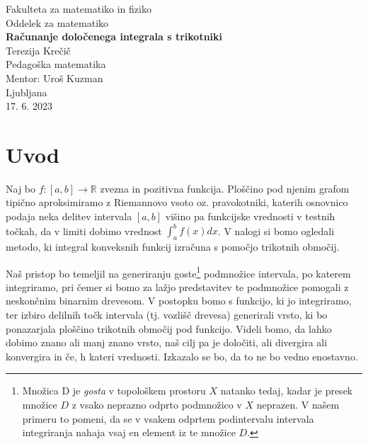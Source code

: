 \documentclass[a4paper, 12pt, titlepage]{article}
\begin{document}
\begin{titlepage}
    \begin{center}
        \large
        Fakulteta za matematiko in fiziko\\
        Oddelek za matematiko \\
        \vspace{8cm}
        \Huge
        \textbf{Računanje določenega integrala s trikotniki} \\
        \vspace{7.5cm}
        \large
        Terezija Krečič\\
        Pedagoška matematika\\
        \vspace{1cm}
        Mentor: Uroš Kuzman\\
        \vspace{0.5cm}
        Ljubljana\\
        17. 6. 2023
    \end{center}
\end{titlepage}

\tableofcontents
\newpage

\section{Uvod}

Naj bo $ f: [a,b] \rightarrow \mathbb{R} $ zvezna in pozitivna funkcija. Ploščino pod njenim grafom tipično aproksimiramo z Riemannovo vsoto oz. pravokotniki, katerih osnovnico podaja neka delitev intervala $[a,b]$ višino pa funkcijske vrednosti v testnih točkah, da v limiti dobimo vrednost $ \int_{a}^{b}f(x)dx $. V nalogi si bomo ogledali metodo, ki integral konveksnih funkcij izračuna s pomočjo trikotnih območij.

Naš pristop bo temeljil na generiranju goste\footnote{Množica D je \emph{gosta} v topološkem prostoru $ X $ natanko tedaj, kadar je presek množice $ D $ z vsako neprazno odprto podmnožico v $ X $ neprazen. V našem primeru to pomeni, da se v vsakem odprtem podintervalu intervala integriranja nahaja vsaj en element iz te množice $ D $.} podmnožice intervala, po katerem integriramo, pri čemer si bomo za lažjo predstavitev te podmnožice pomogali z neskončnim binarnim drevesom. V postopku bomo s funkcijo, ki jo integriramo, ter izbiro delilnih točk intervala (tj. vozlišč drevesa) generirali vrsto, ki bo ponazarjala ploščino trikotnih območij pod funkcijo. Videli bomo, da lahko dobimo znano ali manj znano vrsto, naš cilj pa je določiti, ali divergira ali konvergira in če, h kateri vrednosti. Izkazalo se bo, da to ne bo vedno enostavno.
\end{document}
